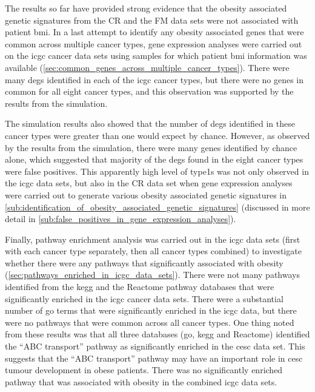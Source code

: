 The results so far have provided strong evidence that the obesity associated genetic signatures from the CR and the FM data sets were not associated with patient \gls{bmi}.
In a last attempt to identify any obesity associated genes that were common across multiple cancer types, gene expression analyses were carried out on the \gls{icgc} cancer data sets using samples for which patient \gls{bmi} information was available (\cref{sec:common_genes_across_multiple_cancer_types}).
There were many \glspl{deg} identified in each of the \gls{icgc} cancer types, but there were no genes in common for all eight cancer types, and this observation was supported by the results from the simulation.

The simulation results also showed that the number of \glspl{deg} identified in these cancer types were greater than one would expect by chance.
However, as observed by the results from the simulation, there were many genes identified by chance alone, which suggested that majority of the \glspl{deg} found in the eight cancer types were false positives.
This apparently high level of \Glspl{type1} was not only observed in the \gls{icgc} data sets, but also in the CR data set when gene expression analyses were carried out to generate various obesity associated genetic signatures in \cref{sub:identification_of_obesity_associated_genetic_signatures} (discussed in more detail in \cref{sub:false_positives_in_gene_expression_analyses}).

Finally, pathway enrichment analysis was carried out in the \gls{icgc} data sets (first with each cancer type separately, then all cancer types combined) to investigate whether there were any pathways that significantly associated with obesity (\cref{sec:pathways_enriched_in_icgc_data_sets}).
There were not many pathways identified from the \gls{kegg} and the Reactome pathway databases that were significantly enriched in the \gls{icgc} cancer data sets.
There were a substantial number of \gls{go} terms that were significantly enriched in the \gls{icgc} data, but there were no pathways that were common across all cancer types.
One thing noted from these results was that all three databases (\gls{go}, \gls{kegg} and Reactome) identified the ``ABC transport'' pathway as significantly enriched in the \gls{cesc} data set.
This suggests that the ``ABC transport'' pathway may have an important role in \gls{cesc} tumour development in obese patients.
There was no significantly enriched pathway that was associated with obesity in the combined \gls{icgc} data sets.

